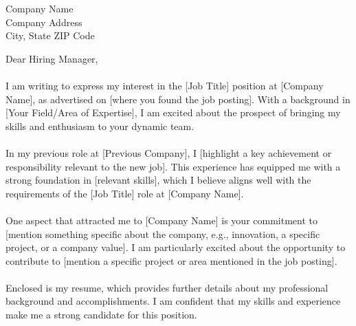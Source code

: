 \documentclass[a4paper,10pt]{letter}
\date{\today}
\begin{document}
\begin{letter}{Company Name \\ Company Address \\ City, State ZIP Code}

\opening{Dear Hiring Manager,}

\paragraph{} %

I am writing to express my interest in the [Job Title] position at [Company Name], as advertised on [where you found the job posting]. With a background in [Your Field/Area of Expertise], I am excited about the prospect of bringing my skills and enthusiasm to your dynamic team.

\paragraph{} %

In my previous role at [Previous Company], I [highlight a key achievement or responsibility relevant to the new job]. This experience has equipped me with a strong foundation in [relevant skills], which I believe aligns well with the requirements of the [Job Title] role at [Company Name].

\paragraph{} %

One aspect that attracted me to [Company Name] is your commitment to [mention something specific about the company, e.g., innovation, a specific project, or a company value]. I am particularly excited about the opportunity to contribute to [mention a specific project or area mentioned in the job posting].

\paragraph{} %

Enclosed is my resume, which provides further details about my professional background and accomplishments. I am confident that my skills and experience make me a strong candidate for this position.

\paragraph{} %


\end{letter}
\end{document}
